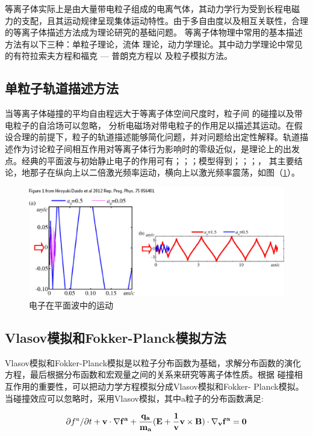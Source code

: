 等离子体实际上是由大量带电粒子组成的电离气体，其动力学行为受到长程电磁
力的支配，且其运动规律呈现集体运动特性。由于多自由度以及相互关联性，合理的等离子体描述方法成为理论研究的基础问题。
等离子体物理中常用的基本描述方法有以下三种：单粒子理论，流体
理论，动力学理论。其中动力学理论中常见的有符拉索夫方程和福克 — 普朗克方程以
及粒子模拟方法。




\subsection{单粒子轨道描述方法}
当等离子体碰撞的平均自由程远大于等离子体空间尺度时，粒子间
的碰撞以及带电粒子的自洽场可以忽略，
分析电磁场对带电粒子的作用足以描述其运动。在假设合理的前提下，粒子的轨道描述能够简化问题，并对问题给出定性解释。轨道描述作为讨论粒子间相互作用对等离子体行为影响时的零级近似，是理论上的出发点。经典的平面波与初始静止电子的作用可有；；；模型得到；；；， 其主要结论，地那子在纵向上以二倍激光频率运动，横向上以激光频率震荡，如图（\ref{fig:singleelectron}）。
\begin{figure}[!htbp]
  \centering
  \includegraphics[width=\MyFactor\textwidth]{Img/singElectron2012Trajectory.eps}
  \caption{电子在平面波中的运动}
  \label{fig:singleelectron}
\end{figure}


\subsection{Vlasov模拟和Fokker-Planck模拟方法}
Vlasov模拟和Fokker-Planck模拟是以粒子分布函数为基础，求解分布函数的演化方程，最后根据分布函数和宏观量之间的关系来研究等离子体性质。根据
碰撞相互作用的重要性，可以把动力学方程模拟分成Vlasov模拟和Fokker-
Planck模拟。
当碰撞效应可以忽略时，采用Vlasov模拟，其中a粒子的分布函数满足:

\begin{equation}
\label{eqn:vlasov_distribution}
\partial{f^a}/\partial{t}+\bf{v} \cdot {\nabla}f^a +  \dfrac{q_a }  
{m_a} 
(\bf{E}+ 
\dfrac{1}{v}  \bf{v} \times \bf{B}) \cdot  {\nabla}_v f^a = 0 
\end{equation}     

